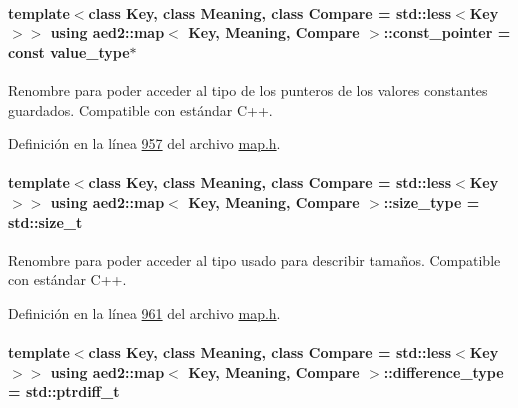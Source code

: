 \paragraph[{\texorpdfstring{const\+\_\+pointer}{const_pointer}}]{\setlength{\rightskip}{0pt plus 5cm}template$<$class Key, class Meaning, class Compare = std\+::less$<$\+Key$>$$>$ using {\bf aed2\+::map}$<$ Key, Meaning, Compare $>$\+::{\bf const\+\_\+pointer} =  const {\bf value\+\_\+type}$\ast$}\hypertarget{classaed2_1_1map_a1366fc3e227a49777cb748fc6d4e022b_a1366fc3e227a49777cb748fc6d4e022b}{}\label{classaed2_1_1map_a1366fc3e227a49777cb748fc6d4e022b_a1366fc3e227a49777cb748fc6d4e022b}


Renombre para poder acceder al tipo de los punteros de los valores constantes guardados. Compatible con estándar C++. 



Definición en la línea \hyperlink{map_8h_source_l00957}{957} del archivo \hyperlink{map_8h_source}{map.\+h}.

\paragraph[{\texorpdfstring{size\+\_\+type}{size_type}}]{\setlength{\rightskip}{0pt plus 5cm}template$<$class Key, class Meaning, class Compare = std\+::less$<$\+Key$>$$>$ using {\bf aed2\+::map}$<$ Key, Meaning, Compare $>$\+::{\bf size\+\_\+type} =  std\+::size\+\_\+t}\hypertarget{classaed2_1_1map_a8cf1c570f605e9c0ad6feb8ce12c9400_a8cf1c570f605e9c0ad6feb8ce12c9400}{}\label{classaed2_1_1map_a8cf1c570f605e9c0ad6feb8ce12c9400_a8cf1c570f605e9c0ad6feb8ce12c9400}


Renombre para poder acceder al tipo usado para describir tamaños. Compatible con estándar C++. 



Definición en la línea \hyperlink{map_8h_source_l00961}{961} del archivo \hyperlink{map_8h_source}{map.\+h}.

\paragraph[{\texorpdfstring{difference\+\_\+type}{difference_type}}]{\setlength{\rightskip}{0pt plus 5cm}template$<$class Key, class Meaning, class Compare = std\+::less$<$\+Key$>$$>$ using {\bf aed2\+::map}$<$ Key, Meaning, Compare $>$\+::{\bf difference\+\_\+type} =  std\+::ptrdiff\+\_\+t}\hypertarget{classaed2_1_1map_a2f55b88809000fcbfce1c6cfef1ba74d_a2f55b88809000fcbfce1c6cfef1ba74d}{}\label{classaed2_1_1map_a2f55b88809000fcbfce1c6cfef1ba74d_a2f55b88809000fcbfce1c6cfef1ba74d}


